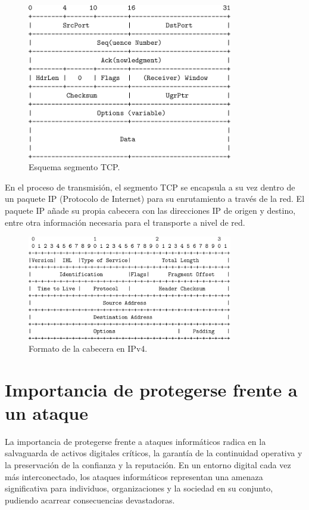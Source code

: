 \begin{figure}[htbp]
    \centering
    \includegraphics[width=0.8\textwidth]{./img/ent-problema/SegmentoTCP.png}
    \caption{Esquema segmento TCP. \cite{tcpsegment}}
    \label{fig:SegmentoTCP}
\end{figure}

En el proceso de transmisión, el segmento TCP se encapsula a su vez dentro de un paquete IP (Protocolo de Internet) para su enrutamiento a través de la red. El paquete IP añade su propia cabecera con las direcciones IP de origen y destino, entre otra información necesaria para el transporte a nivel de red. 

\begin{figure}[htbp]
    \centering
    \includegraphics[width=0.8\textwidth]{./img/ent-problema/PaqueteIP.png}
    \caption{Formato de la cabecera en IPv4. \cite{paqueteip}}
    \label{fig:PaqueteIP}
\end{figure}

\section{Importancia de protegerse frente a un ataque}

La importancia de protegerse frente a ataques informáticos radica en la salvaguarda de activos digitales críticos, la garantía de la continuidad operativa y la preservación de la confianza y la reputación. En un entorno digital cada vez más interconectado, los ataques informáticos representan una amenaza significativa para individuos, organizaciones y la sociedad en su conjunto, pudiendo acarrear consecuencias devastadoras.

